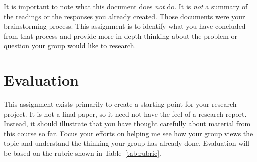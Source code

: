 \documentclass[12pt]{amsart}	%
\begin{document}
 It is important to note what this document does \emph{not} do. It is \emph{not} a summary of the readings or the responses you already created. Those documents were your brainstorming process. This assignment is to identify what you have concluded from that process and provide more in-depth thinking about the problem or question your group would like to research.

\section{Evaluation} %
\label{sec:evaluation}
This assignment exists primarily to create a starting point for your research project. It is not a final paper, so it need not have the feel of a research report. Instead, it should illustrate that you have thought carefully about material from this course so far. Focus your efforts on helping me see how your group views the topic and understand the thinking your group has already done. Evaluation will be based on the rubric shown in Table~\ref{tab:rubric}.

\begin{comment}%
	\section{Procedure} %
	\label{sec:procedure}
	Before you start auditing your brainstorming process, get your thoughts in order. Your reading responses, history as a writer, and research experience (if any) should be in mind as you draft this assignment.
	\begin{enumerate}
		\item Identify a problem, issue, or concern you have related to writing, reading, language, or literacy. Choose something you would genuinely like to learn more about.
		\item Question yourself to determine why this topic interests you or why you want to know more about it. You might want to discuss it with a friend or do some freewriting to get your thoughts moving.
		\item Come up with a finish line. What could you learn that would satisfy your curiosity? What is your goal in this project?
		\item Now write. Put the ideas from the items above in a two-page document that puts your ideas in writing, helps me understand your thinking/goals, and shows your classmates where you're heading with your project.
	\end{enumerate}
\end{comment}
\end{document}
